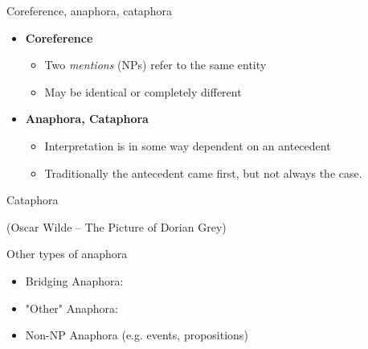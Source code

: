 \documentclass[dvipsnames, 10pt, compress]{beamer}
\begin{document}
\begin{frame}{Coreference, anaphora, cataphora}

\begin{itemize}
  \item  \textbf{Coreference} 
  \begin{itemize}  
    \item Two \emph{mentions} (NPs) refer to the same entity 
    \item May be identical or completely different
  \end{itemize}
  \item \textbf{Anaphora, Cataphora} 
  \begin{itemize}
    \item Interpretation is in some way dependent on an antecedent
    \item Traditionally the antecedent came first, but not always the case.
  \end{itemize}
\end{itemize}

\end{frame}


\begin{frame}{Cataphora}




(Oscar Wilde -- The Picture of Dorian Grey)
%

\end{frame}

\begin{frame}{Other types of anaphora}

\begin{itemize}
  \item Bridging Anaphora: 
  \item "Other" Anaphora: 
  \item Non-NP Anaphora (e.g. events, propositions)

\end{itemize}

\end{frame}
\end{document}
